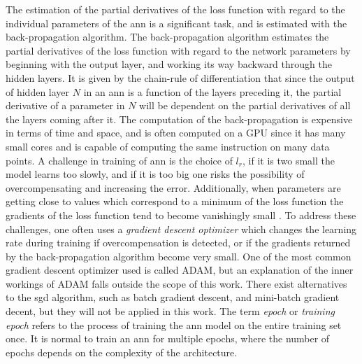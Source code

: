 The estimation of the partial derivatives of the loss function with regard to the individual parameters of the \acrshort{ann} is a significant task, and is estimated with the back-propagation algorithm. The back-propagation algorithm estimates the partial derivatives of the loss function with regard to the network parameters by beginning with the output layer, and working its way backward through the hidden layers. It is given by the chain-rule of differentiation that since the output of hidden layer $N$ in an \acrshort{ann} is a function of the layers preceding it, the partial derivative of a parameter in $N$ will be dependent on the partial derivatives of all the layers coming after it. The computation of the back-propagation is expensive in terms of time and space, and is often computed on a GPU since it has many small cores and is capable of computing the same instruction on many data points. A challenge in training of \acrshort{ann} is the choice of $l_r$, if it is two small the model learns too slowly, and if it is too big one risks the possibility of overcompensating and increasing the error. Additionally, when parameters are getting close to values which correspond to a minimum of the loss function the gradients of the loss function tend to become vanishingly small \cite{dl_book}. To address these challenges, one often uses a \textit{gradient descent optimizer} which changes the learning rate during training if overcompensation is detected, or if the gradients returned by the back-propagation algorithm become very small. One of the most common gradient descent optimizer used is called ADAM, but an explanation of the inner workings of ADAM falls outside the scope of this work. There exist alternatives to the \acrshort{sgd} algorithm, such as batch gradient descent, and mini-batch gradient decent, but they will not be applied in this work. The term \textit{epoch} or \textit{training epoch} refers to the process of training the \acrshort{ann} model on the entire training set once. It is normal to train an \acrshort{ann} for multiple epochs, where the number of epochs depends on the complexity of the architecture.  

